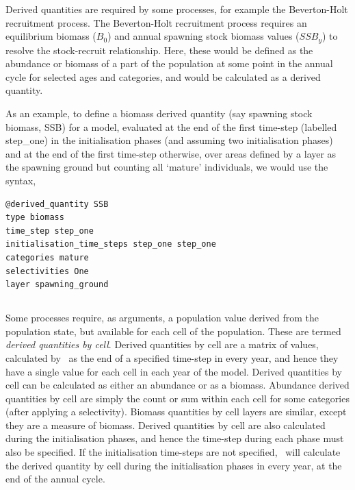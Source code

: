 Derived quantities are required by some processes, for example the Beverton-Holt recruitment process. The Beverton-Holt recruitment process requires an equilibrium biomass ($B_0$) and annual spawning stock biomass values ($SSB_y$) to resolve the stock-recruit relationship. Here, these would be defined as the abundance or biomass of a part of the population at some point in the annual cycle for selected ages and categories, and would be calculated as a derived quantity.

As an example, to define a biomass derived quantity (say spawning stock biomass, SSB) for a model, evaluated at the end of the first time-step (labelled step\_one) in the initialisation phases (and assuming two initialisation phases) and at the end of the first time-step otherwise, over areas defined by a layer as the spawning ground but counting all `mature' individuals, we would use the syntax,

{\small{\begin{verbatim}
@derived_quantity SSB
type biomass
time_step step_one
initialisation_time_steps step_one step_one
categories mature
selectivities One
layer spawning_ground
\end{verbatim}}}

\subsection{\label{sec:derived-quantity-by-cell}}

Some processes require, as arguments, a population value derived from the population state, but available for each cell of the population. These are termed \emph{derived quantities by cell}. Derived quantities by cell are a matrix of values, calculated by \SPM\ as the end of a specified time-step in every year, and hence they have a single value for each cell in each year of the model. Derived quantities by cell can be calculated as either an abundance or as a biomass. Abundance derived quantities by cell are simply the count or sum within each cell for some categories (after applying a selectivity). Biomass quantities by cell layers are similar, except they are a measure of biomass. Derived quantities by cell are also calculated during the initialisation phases, and hence the time-step during each phase must also be specified. If the initialisation time-steps are not specified, \SPM\ will calculate the derived quantity by cell during the initialisation phases in every year, at the end of the annual cycle.

